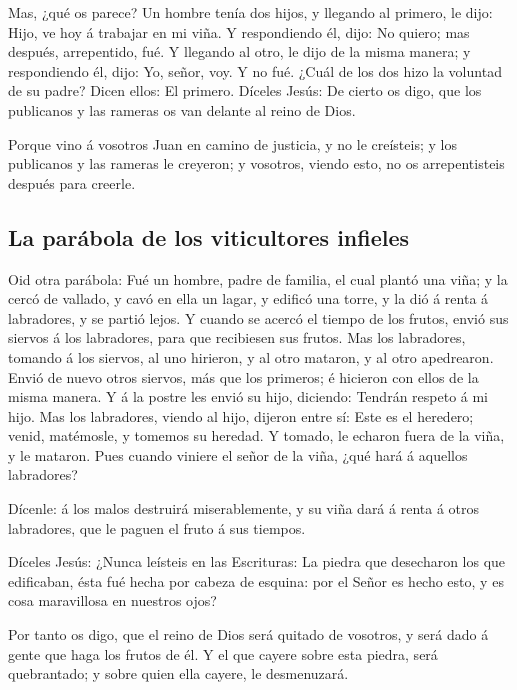  Mas, ¿qué os parece? Un hombre tenía dos hijos, y
llegando al primero, le dijo: Hijo, ve hoy á trabajar en mi viña.
 Y respondiendo él, dijo: No quiero; mas después,
arrepentido, fué.  Y llegando al otro, le dijo de la
misma manera; y respondiendo él, dijo: Yo, señor, voy. Y no fué.
 ¿Cuál de los dos hizo la voluntad de su padre? Dicen
ellos: El primero. Díceles Jesús: De cierto os digo, que los publicanos
y las rameras os van delante al reino de Dios.

 Porque vino á vosotros Juan en camino de justicia, y no
le creísteis; y los publicanos y las rameras le creyeron; y vosotros,
viendo esto, no os arrepentisteis después para creerle.

\hypertarget{la-paruxe1bola-de-los-viticultores-infieles}{%
\subsection{La parábola de los viticultores
infieles}\label{la-paruxe1bola-de-los-viticultores-infieles}}

 Oid otra parábola: Fué un hombre, padre de familia, el
cual plantó una viña; y la cercó de vallado, y cavó en ella un lagar, y
edificó una torre, y la dió á renta á labradores, y se partió lejos.
 Y cuando se acercó el tiempo de los frutos, envió sus
siervos á los labradores, para que recibiesen sus frutos.
 Mas los labradores, tomando á los siervos, al uno
hirieron, y al otro mataron, y al otro apedrearon.  Envió
de nuevo otros siervos, más que los primeros; é hicieron con ellos de la
misma manera.  Y á la postre les envió su hijo, diciendo:
Tendrán respeto á mi hijo.  Mas los labradores, viendo al
hijo, dijeron entre sí: Este es el heredero; venid, matémosle, y tomemos
su heredad.  Y tomado, le echaron fuera de la viña, y le
mataron.  Pues cuando viniere el señor de la viña, ¿qué
hará á aquellos labradores?

 Dícenle: á los malos destruirá miserablemente, y su viña
dará á renta á otros labradores, que le paguen el fruto á sus tiempos.

 Díceles Jesús: ¿Nunca leísteis en las Escrituras: La
piedra que desecharon los que edificaban, ésta fué hecha por cabeza de
esquina: por el Señor es hecho esto, y es cosa maravillosa en nuestros
ojos?

 Por tanto os digo, que el reino de Dios será quitado de
vosotros, y será dado á gente que haga los frutos de él. 
Y el que cayere sobre esta piedra, será quebrantado; y sobre quien ella
cayere, le desmenuzará.

